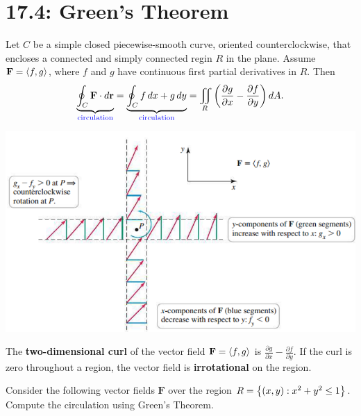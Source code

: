 \documentclass[mathNotesPreamble]{subfiles}
\begin{document}
\section{17.4: Green's Theorem}

  \begin{thmBox*}
    Let $C$ be a simple closed piecewise-smooth curve, oriented counterclockwise, that encloses a connected and simply connected regin $R$ in the plane. Assume $\mathbf F={\left\langle f,g \right\rangle}$, where $f$ and $g$ have continuous first partial derivatives in $R$. Then
      \[\underbrace{\oint_C \mathbf F\cdot d{\mathbf{r}}}_{\textcolor{blue}{\textnormal{circulation}}}=\underbrace{\oint_C f\,dx+g\,dy}_{\textcolor{blue}{\textnormal{circulation}}}=\iint\limits_R{\left(\frac{\partial g}{\partial x}-\frac{\partial f}{\partial y}\right)}\,dA.\]
  \end{thmBox*}

  \begin{flushright}
    \includegraphics[width=0.825\linewidth]{images/briggs_17_04/fig17_32}
  \end{flushright}

  \begin{defn*}
    The \textbf{two-dimensional curl} of the vector field $\mathbf F={\left\langle f,g \right\rangle}$ is $\displaystyle \frac{\partial g}{\partial x}-\frac{\partial f}{\partial y}$. If the curl is zero throughout a region, the vector field is \textbf{irrotational} on the region.
  \end{defn*}
  \pagebreak

  \noindent
  \begin{ex*}
    Consider the following vector fields $\mathbf F$ over the region $R={\left\{(x,y): x^2+y^2\leq 1\right\}}$. Compute the circulation using Green's Theorem.
  \end{ex*}
  
\end{document}
